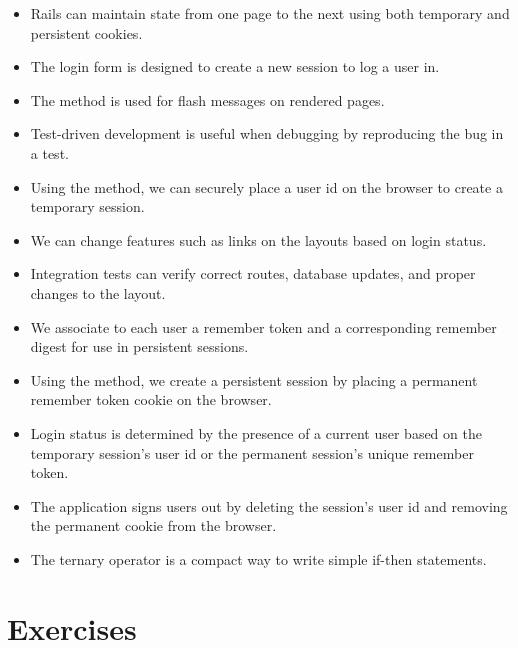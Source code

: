 \begin{itemize}
\item Rails can maintain state from one page to the next using both temporary and persistent cookies.
\item The login form is designed to create a new session to log a user in.
\item The  method is used for flash messages on rendered pages.
\item Test-driven development is useful when debugging by reproducing the bug in a test.
\item Using the  method, we can securely place a user id on the browser to create a temporary session.
\item We can change features such as links on the layouts based on login status.
\item Integration tests can verify correct routes, database updates, and proper changes to the layout.
\item We associate to each user a remember token and a corresponding remember digest for use in persistent sessions.
\item Using the  method, we create a persistent session by placing a permanent remember token cookie on the browser.
\item Login status is determined by the presence of a current user based on the temporary session's user id or the permanent session's unique remember token.
\item The application signs users out by deleting the session's user id and removing the permanent cookie from the browser.
\item The ternary operator is a compact way to write simple if-then statements.
\end{itemize}


  \section{Exercises} %
  \label{sec:log_in_out_exercises}




